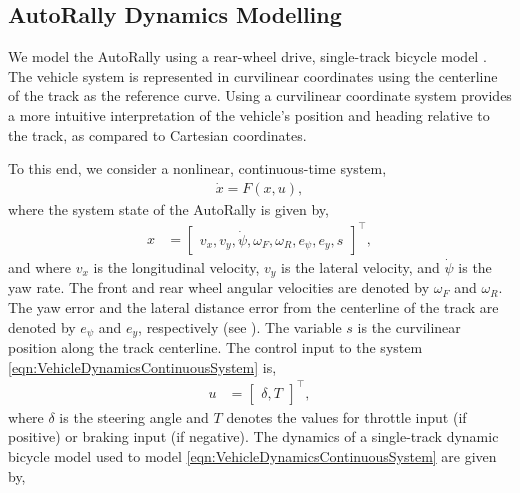 \subsection{AutoRally Dynamics Modelling}\label{AppendixA} We model the AutoRally using a rear-wheel drive, single-track bicycle model \cite{CSSMPC}.
The vehicle system is represented in curvilinear coordinates using the centerline of the track as the reference curve. Using a curvilinear coordinate system provides a more intuitive interpretation of the vehicle's position and heading relative to the track, as compared to Cartesian coordinates.

To this end, we consider a nonlinear, continuous-time system,
\begin{align}\label{eqn:VehicleDynamicsContinuousSystem}
    \dot{x} = F(x, u),
\end{align}
where the system state of the AutoRally is given by,
\begin{align}
	x &= \begin{bmatrix}
		v_x, v_y, \dot{\psi}, \omega_F, \omega_R, e_\psi,  e_y, s
	\end{bmatrix}^\intercal,
	\label{eqn:autorally_state_space}
\end{align}
 and where $v_x$ is the longitudinal velocity, $v_y$ is the lateral velocity,  and $\dot{\psi}$ is the yaw rate. The front and rear wheel angular velocities are denoted by $\omega_F$ and $\omega_R$.
The yaw error and the lateral distance error from the centerline of the track are denoted by $e_\psi$ and $e_y$, respectively (see ). 
The variable $s$ is the curvilinear position along the track centerline.
The control input to the system \eqref{eqn:VehicleDynamicsContinuousSystem} is,
\begin{align}
    u &= \begin{bmatrix}
		\delta, T
	\end{bmatrix}^\intercal,
\end{align}
where $\delta$ is the steering angle and $T$ denotes the values for throttle input (if positive) or braking input (if negative). The dynamics of a single-track dynamic bicycle model \cite{CSSMPC} used to model \eqref{eqn:VehicleDynamicsContinuousSystem} are given by,
